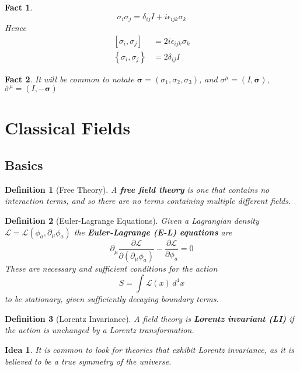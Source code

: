 \documentclass{article}
\newtheorem{definition}{Definition}[subsection]
\newtheorem{fact}{Fact}[subsection]
\newtheorem*{idea}{Idea}
\newcommand{\eps}{\epsilon}
\newcommand{\del}{\partial}
\newcommand{\bam}[1]{\textbf{#1}}
\newcommand{\mc}[1]{\mathcal{#1}}
\newcommand{\comm}[2][]{\left[ #1, #2 \right]} %
\newcommand{\acomm}[2][]{\left\{ #1, #2 \right\}} %
\newcommand{\pd}[2][]{\frac{\partial#1}{\partial#2}} %
\begin{document}
\begin{fact}
\[
\sigma_i \sigma_j = \delta_{ij}I +i\epsilon_{ijk}\sigma_k
\]
Hence 
\begin{align*}
    \comm[\sigma_i]{\sigma_j} &= 2i\eps_{ijk}\sigma_k \\
    \acomm[\sigma_i]{\sigma_j} &= 2\delta_{ij}I
\end{align*}
\end{fact}

\begin{fact}
It will be common to notate $\bm{\sigma}=(\sigma_1, \sigma_2, \sigma_3)$, and $\sigma^\mu=(I,\bm{\sigma})$, $\bar{\sigma}^\mu=(I, -\bm{\sigma})$
\end{fact}
\section{Classical Fields}

\subsection{Basics}

\begin{definition}[Free Theory]
A \bam{free field theory} is one that contains no interaction terms, and so there are no terms containing multiple different fields. 
\end{definition}

\begin{definition}[Euler-Lagrange Equations]
Given a Lagrangian density $\mathcal{L}=\mathcal{L}(\phi_a,\del_\mu \phi_a)$ the \bam{Euler-Lagrange (E-L) equations} are 
\[
\del_\mu \pd[\mc{L}]{(\del_\mu \phi_a)}-\pd[\mc{L}]{\phi_a}=0
\]
These are necessary and sufficient conditions for the action 
\[
S=\int \mc{L}(x) \, d^4x
\]
to be stationary, given sufficiently decaying boundary terms. 
\end{definition}

\begin{definition}[Lorentz Invariance]
A field theory is \bam{Lorentz invariant (LI)} if the action is unchanged by a Lorentz transformation. 
\end{definition}

\begin{idea}
It is common to look for theories that exhibit Lorentz invariance, as it is believed to be a true symmetry of the universe.
\end{idea}
\end{document}
